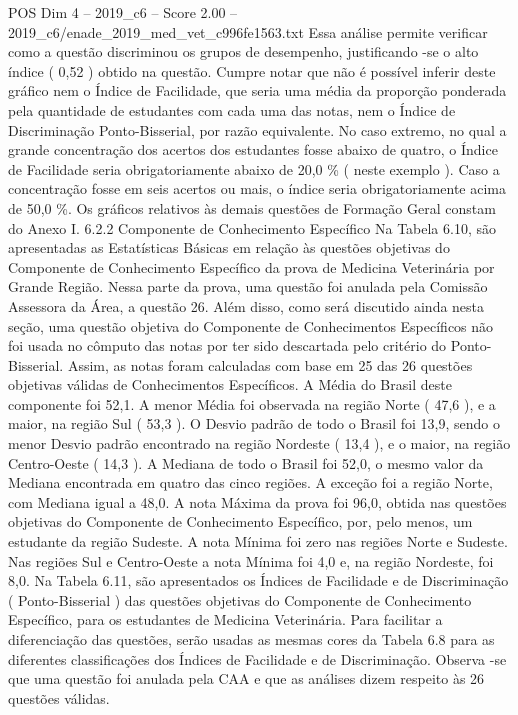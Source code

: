 \begin{textsample}{POS Dim 4 – 2019\_c6 – Score 2.00 – 2019\_c6/enade\_2019\_med\_vet\_c996fe1563.txt}
Essa análise permite verificar como a questão discriminou os grupos de desempenho, justificando -se o alto índice ( 0,52 ) obtido na questão.
Cumpre notar que não é possível inferir deste gráfico nem o Índice de Facilidade, que seria uma média da proporção ponderada pela quantidade de estudantes com cada uma das notas, nem o Índice de Discriminação Ponto-Bisserial, por razão equivalente.
No caso extremo, no qual a grande concentração dos acertos dos estudantes fosse abaixo de quatro, o Índice de Facilidade seria obrigatoriamente abaixo de 20,0 \% ( neste exemplo ).
Caso a concentração fosse em seis acertos ou mais, o índice seria obrigatoriamente acima de 50,0 \%.
Os gráficos relativos às demais questões de Formação Geral constam do Anexo I. 6.2.2 Componente de Conhecimento Específico Na Tabela 6.10, são apresentadas as Estatísticas Básicas em relação às questões objetivas do Componente de Conhecimento Específico da prova de Medicina Veterinária por Grande Região.
Nessa parte da prova, uma questão foi anulada pela Comissão Assessora da Área, a questão 26.
Além disso, como será discutido ainda nesta seção, uma questão objetiva do Componente de Conhecimentos Específicos não foi usada no cômputo das notas por ter sido descartada pelo critério do Ponto-Bisserial.
Assim, as notas foram calculadas com base em 25 das 26 questões objetivas válidas de Conhecimentos Específicos.
A Média do Brasil deste componente foi 52,1.
A menor Média foi observada na região Norte ( 47,6 ), e a maior, na região Sul ( 53,3 ).
O Desvio padrão de todo o Brasil foi 13,9, sendo o menor Desvio padrão encontrado na região Nordeste ( 13,4 ), e o maior, na região Centro-Oeste ( 14,3 ).
A Mediana de todo o Brasil foi 52,0, o mesmo valor da Mediana encontrada em quatro das cinco regiões.
A exceção foi a região Norte, com Mediana igual a 48,0.
A nota Máxima da prova foi 96,0, obtida nas questões objetivas do Componente de Conhecimento Específico, por, pelo menos, um estudante da região Sudeste.
A nota Mínima foi zero nas regiões Norte e Sudeste.
Nas regiões Sul e Centro-Oeste a nota Mínima foi 4,0 e, na região Nordeste, foi 8,0.
Na Tabela 6.11, são apresentados os Índices de Facilidade e de Discriminação ( Ponto-Bisserial ) das questões objetivas do Componente de Conhecimento Específico, para os estudantes de Medicina Veterinária.
Para facilitar a diferenciação das questões, serão usadas as mesmas cores da Tabela 6.8 para as diferentes classificações dos Índices de Facilidade e de Discriminação.
Observa -se que uma questão foi anulada pela CAA e que as análises dizem respeito às 26 questões válidas.

\end{textsample}
